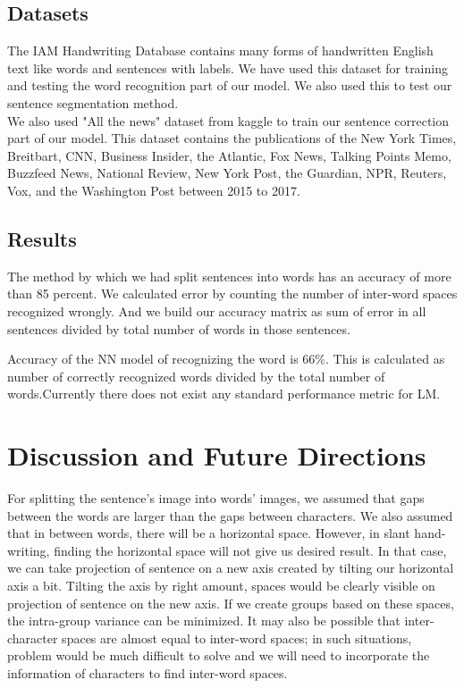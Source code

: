 \documentclass[a4paper, 10pt,twocolumn]{article}
\begin{document}
\subsection*{Datasets} 
The IAM Handwriting Database contains many forms of handwritten English text like words and sentences with labels. We have used this dataset for training and testing the word recognition part of our model. We also used this to test our sentence segmentation method. 
\\
We also used "All the news" dataset from kaggle to train our sentence correction part of our model. This dataset contains the publications of the New York Times, Breitbart, CNN, Business Insider, the Atlantic, Fox News, Talking Points Memo, Buzzfeed News, National Review, New York Post, the Guardian, NPR, Reuters, Vox, and the Washington Post between 2015 to 2017. 
\subsection*{Results} 
The method by which we had split sentences into words has an accuracy of more than 85 percent. We calculated error by counting the number of inter-word spaces recognized wrongly. And we build our accuracy matrix as sum of error in all sentences divided by total number of words in those sentences.

Accuracy of the NN model of recognizing the word is 66\%. This is calculated as number of correctly recognized words divided by the total number of words.\newline Currently there does not exist any standard performance metric for LM.

\section{Discussion and Future Directions} 
For splitting the sentence's image into words' images, we assumed that gaps between the words are larger than the gaps between characters. We also assumed that in between words, there will be a horizontal space. However, in slant hand-writing, finding the horizontal space will not give us desired result. In that case, we can take projection of sentence on a new axis created by tilting our horizontal axis a bit. Tilting the axis by right amount, spaces would be clearly visible on projection of sentence on the new axis. If we create groups based on these spaces, the intra-group variance can be minimized. It may also be possible that inter-character spaces are almost equal to inter-word spaces; in such situations, problem would be much difficult to solve and we will need to incorporate the information of characters to find inter-word spaces.\newline
\end{document}
